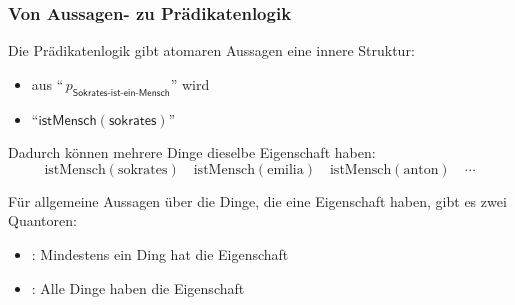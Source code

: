 \documentclass[aspectratio=1610,onlymath]{beamer}
\begin{document}
% 
% 
% 
% 



\begin{frame}\frametitle{Von Aussagen- zu Prädikatenlogik}

Die Prädikatenlogik gibt atomaren Aussagen eine innere Struktur:
\begin{itemize}
\item aus "`$\,p_{\textsf{Sokrates-ist-ein-Mensch}}\!$"' wird
\item "`$\textsf{istMensch}(\textsf{sokrates})$"'
\end{itemize}\bigskip\pause

Dadurch können mehrere Dinge dieselbe Eigenschaft haben:
\[ \text{istMensch}(\text{sokrates})\quad \text{istMensch}(\text{emilia})\quad \text{istMensch}(\text{anton})\quad\cdots\]

\pause Für allgemeine Aussagen über die Dinge, die eine Eigenschaft haben, gibt es zwei
\alert{Quantoren:}
\begin{itemize}
\item {}: Mindestens ein Ding hat die Eigenschaft
\item {}: Alle Dinge haben die Eigenschaft
\end{itemize}

\end{frame}
\end{document}
